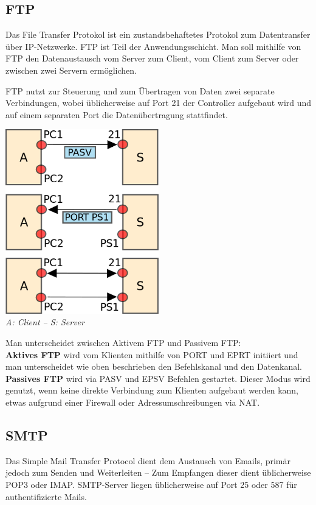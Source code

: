\documentclass{article}
\begin{document}
    \subsection{FTP}
    Das File Transfer Protokol ist ein zustandsbehaftetes Protokol zum Datentransfer über IP-Netzwerke. FTP ist Teil der Anwendungsschicht.
    Man soll mithilfe von FTP den Datenaustausch vom Server zum Client, vom Client zum Server oder zwischen zwei Servern ermöglichen.
    
    FTP nutzt zur Steuerung und zum Übertragen von Daten zwei separate Verbindungen, wobei üblicherweise auf Port 21 der Controller aufgebaut wird und auf einem separaten Port die Datenübertragung stattfindet.
    \begin{center}
        \includegraphics[width=0.5\textwidth]{FTPConnectionBuildup.png}\\
        \textit{A: Client -- S: Server\\}
    \end{center}
    
    Man unterscheidet zwischen Aktivem FTP und Passivem FTP:\\
    \textbf{Aktives FTP} wird vom Klienten mithilfe von PORT und EPRT initiiert und man unterscheidet wie oben beschrieben den Befehlskanal und den Datenkanal.\\
\textbf{Passives FTP} wird via PASV und EPSV Befehlen gestartet. Dieser Modus wird genutzt, wenn keine direkte Verbindung zum Klienten aufgebaut werden kann, etwas aufgrund einer Firewall oder Adressumschreibungen via NAT.
    
    \subsection{SMTP}
    Das Simple Mail Transfer Protocol dient dem Austausch von Emails, primär jedoch zum Senden und Weiterleiten -- Zum Empfangen dieser dient üblicherweise POP3 oder IMAP.
    SMTP-Server liegen üblicherweise auf Port 25 oder 587 für authentifizierte Mails.
    
\end{document}
